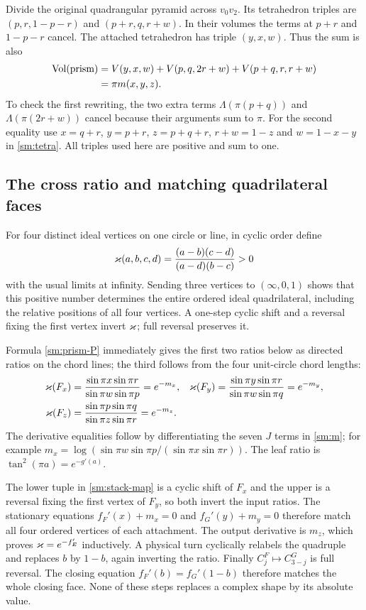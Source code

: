 Divide the original quadrangular pyramid across $v_0v_2$.
Its tetrahedron triples are $(p,r,1-p-r)$ and
$(p+r,q,r+w)$. In their volumes the terms at $p+r$ and
$1-p-r$ cancel. The attached tetrahedron has triple $(y,x,w)$.
Thus the sum is also
\begin{equation}\label{sm:prism-volume}
 \begin{split}
 \operatorname{Vol}(\text{prism})
 &=V(y,x,w)+V(p,q,2r+w)+V(p+q,r,r+w)\\
 &=\pi m(x,y,z).
 \end{split}
\end{equation}
To check the first rewriting, the two extra terms
$\Lambda(\pi(p+q))$ and $\Lambda(\pi(2r+w))$ cancel because
their arguments sum to $\pi$. For the second equality use
$x=q+r$, $y=p+r$, $z=p+q+r$, $r+w=1-z$ and
$w=1-x-y$ in \eqref{sm:tetra}. All triples used here are
positive and sum to one.

\subsection{The cross ratio and matching quadrilateral faces}
For four distinct ideal vertices on one circle or line, in cyclic order define
\begin{equation}\label{sm:kappa}
 \varkappa(a,b,c,d)=\frac{(a-b)(c-d)}{(a-d)(b-c)}>0
\end{equation}
with the usual limits at infinity. Sending three vertices
to $(\infty,0,1)$ shows that this positive number determines
the entire ordered ideal quadrilateral, including the relative positions of all four vertices.
A one-step cyclic shift and a reversal fixing the first
vertex invert $\varkappa$; full reversal preserves it.

Formula \eqref{sm:prism-P} immediately gives the first two
ratios below as directed ratios on the chord lines; the
third follows from the four unit-circle chord lengths:
\begin{align}
 \varkappa(F_x)&=\frac{\sin\pi x\sin\pi r}
                    {\sin\pi w\sin\pi p}=e^{-m_x},&
 \varkappa(F_y)&=\frac{\sin\pi y\sin\pi r}
                    {\sin\pi w\sin\pi q}=e^{-m_y},\label{sm:input-kappa}\\
 \varkappa(F_z)&=\frac{\sin\pi p\sin\pi q}
                    {\sin\pi z\sin\pi r}=e^{-m_z}.&&\label{sm:output-kappa}
\end{align}
The derivative equalities follow by differentiating the seven
$J$ terms in \eqref{sm:m}; for example
$m_x=\log(\sin\pi w\sin\pi p/(\sin\pi x\sin\pi r))$.
The leaf ratio is $\tan^2(\pi a)=e^{-g'(a)}$.

The lower tuple in \eqref{sm:stack-map} is a cyclic shift of
$F_x$ and the upper is a reversal fixing the first vertex of
$F_y$, so both invert the input ratios. The stationary equations
$f_F'(x)+m_x=0$ and $f_G'(y)+m_y=0$ therefore match all four
ordered vertices of each attachment. The output derivative is
$m_z$, which proves $\varkappa=e^{-f_E'}$ inductively.
A physical turn cyclically relabels the quadruple and replaces
$b$ by $1-b$, again inverting the ratio.
Finally $C_j^F\mapsto C_{3-j}^G$ is full reversal.
The closing equation $f_F'(b)=f_G'(1-b)$ therefore matches the
whole closing face. None of these steps replaces a complex
shape by its absolute value.
